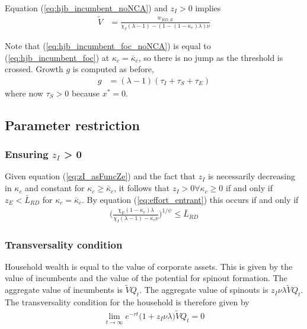 \documentclass[12pt,english]{article}
\theoremstyle{remark}
\begin{document}
Equation (\ref{eq:hjb_incumbent_noNCA}) and $z_I > 0$ implies
\begin{align}
\tilde{V} &= \frac{w_{RD,E}}{\chi_I(\lambda - 1) - (1-(1-\kappa_{e})\lambda)\nu} \label{eq:hjb_incumbent_foc_noNCA}
\end{align}

Note that (\ref{eq:hjb_incumbent_foc_noNCA}) is equal to (\ref{eq:hjb_incumbent_foc}) at $\kappa_{c} = \bar{\kappa}_c$, so there is no jump as the threshold is crossed. Growth $g$ is computed as before,
\begin{align}
g &= (\lambda - 1)(\tau_I + \tau_S + \tau_E) \label{eq:growth_accounting_noNCA}
\end{align}
where now $\tau_S > 0$ because $x^* = 0$. 

\subsection{Parameter restriction}

\subsubsection{Ensuring $z_I$ > 0}
Given equation (\ref{eq:zI_asFuncZe}) and the fact that $z_I$ is necessarily decreasing in $\kappa_c$ and constant for $\kappa_c \ge \bar{\kappa}_c$, it follows that $z_I > 0 \forall \kappa_c \ge 0$ if and only if $z_E < \bar{L}_{RD}$ for $\kappa_c = \bar{\kappa}_c$. By equation (\ref{eq:effort_entrant}) this occurs if and only if
\begin{align}
	\Big( \frac{\chi_E (1-\kappa_{e}) \lambda}{\chi_I(\lambda-1) - \bar{\kappa}_c \nu } \Big)^{1/\psi} \le \bar{L}_{RD}
\end{align}

\subsubsection{Transversality condition}

Household wealth is equal to the value of corporate assets. This is given by the value of incumbents and the value of the potential for spinout formation. The aggregate value of incumbents is $\tilde{V}Q_t$. The aggregate value of spinouts is $z_I \nu \lambda \tilde{V} Q_t$. The transversality condition for the household is therefore given by 
\begin{align}
	\lim_{t \to \infty} e^{-rt} \big(1 + z_I \nu \lambda \big)\tilde{V} Q_t = 0
\end{align}
\end{document}
